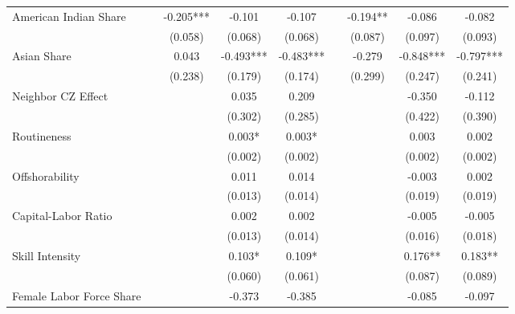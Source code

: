 \begin{table}[htbp]
\begin{tabular}{l*{8}{c}}
\addlinespace
American Indian Share&            &   -0.205***&   -0.101   &   -0.107   &            &   -0.194** &   -0.086   &   -0.082   \\
                    &            &  (0.058)   &  (0.068)   &  (0.068)   &            &  (0.087)   &  (0.097)   &  (0.093)   \\
\addlinespace
Asian Share         &            &    0.043   &   -0.493***&   -0.483***&            &   -0.279   &   -0.848***&   -0.797***\\
                    &            &  (0.238)   &  (0.179)   &  (0.174)   &            &  (0.299)   &  (0.247)   &  (0.241)   \\
\addlinespace
Neighbor CZ Effect  &            &            &    0.035   &    0.209   &            &            &   -0.350   &   -0.112   \\
                    &            &            &  (0.302)   &  (0.285)   &            &            &  (0.422)   &  (0.390)   \\
\addlinespace
Routineness         &            &            &    0.003*  &    0.003*  &            &            &    0.003   &    0.002   \\
                    &            &            &  (0.002)   &  (0.002)   &            &            &  (0.002)   &  (0.002)   \\
\addlinespace
Offshorability      &            &            &    0.011   &    0.014   &            &            &   -0.003   &    0.002   \\
                    &            &            &  (0.013)   &  (0.014)   &            &            &  (0.019)   &  (0.019)   \\
\addlinespace
Capital-Labor Ratio &            &            &    0.002   &    0.002   &            &            &   -0.005   &   -0.005   \\
                    &            &            &  (0.013)   &  (0.014)   &            &            &  (0.016)   &  (0.018)   \\
\addlinespace
Skill Intensity     &            &            &    0.103*  &    0.109*  &            &            &    0.176** &    0.183** \\
                    &            &            &  (0.060)   &  (0.061)   &            &            &  (0.087)   &  (0.089)   \\
\addlinespace
Female Labor Force Share&            &            &   -0.373   &   -0.385   &            &            &   -0.085   &   -0.097   \\

\end{tabular}
\end{table}
